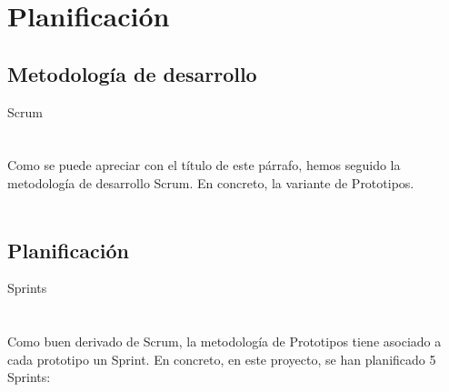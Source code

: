 \documentclass[12pt,letterpaper]{report}
\begin{document}
\section{Planificación}
	\subsection{Metodología de desarrollo}
		\noindent Scrum\\
		\\~\\
		Como se puede apreciar con el título de este párrafo, hemos seguido la metodología de desarrollo Scrum.
		En concreto, la variante de Prototipos.
		\\~\\
	\subsection{Planificación}
		\noindent Sprints\\
		\\~\\
		Como buen derivado de Scrum, la metodología de Prototipos tiene asociado a cada prototipo un Sprint.
		En concreto, en este proyecto, se han planificado 5 Sprints:
		\\~\\
\end{document}
